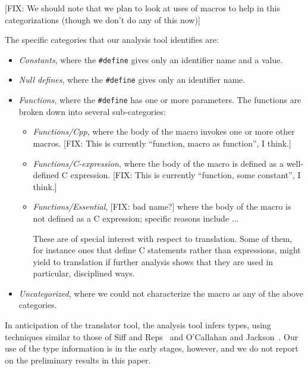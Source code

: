 [FIX: We should note that we plan to look at uses of macros to help in
this categorizations (though we don't do any of this now)]

The specific categories that our analysis tool identifies are:
\begin{itemize}

\item {\em Constants\/}, where the \verb+#define+ gives only an
identifier name and a value.

\item {\em Null defines\/}, where the \verb+#define+ gives only an
identifier name.

\item {\em Functions\/}, where the \verb+#define+ has one or more
parameters.  The functions are broken down into several sub-categories:
\begin{itemize}

\item {\em Functions/Cpp\/}, where the body of the macro invokes one
or more other macros.  [FIX: This is currently ``function, macro as
function'', I think.]

\item {\em Functions/C-expression\/}, where the body of the macro is
defined as a well-defined C expression.  [FIX: This is currently
``function, some constant'', I think.]

\item {\em Functions/Essential\/}, [FIX: bad name?] where the body of the
macro is not defined as a C expression; specific reasons include
...

These are of special interest with respect to translation.  Some of
them, for instance ones that define C statements rather than
expressions, might yield to translation if further analysis shows that
they are used in particular, disciplined ways.

\end{itemize}

\item {\em Uncategorized\/}, where we could not characterize the macro
as any of the above categories.

\end{itemize}

In anticipation of the translator tool, the analysis tool infers
types, using techniques similar to those of Siff and Reps~\cite{Siff-fse96}
and O'Callahan and Jackson~\cite{OCallahan-icse97}.  Our use of the
type information is in the early stages, however, and we do not report
on the preliminary results in this paper.

